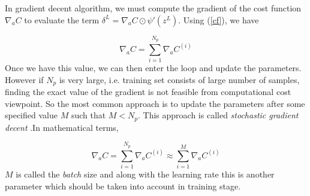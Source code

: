 \documentclass[12pt]{article}
\begin{document}
In gradient decent algorithm, we must compute the gradient of the cost function $\nabla_{a} C $ to evaluate the term $\delta^{L} = \nabla_{a} C \odot  \psi'(z^{L})$. Using (\ref{cf}), we have 

\begin{equation}
\nabla_{a} C =  \sum_{i=1}^{N_{p}}\nabla_{a}C^{(i)}
\end{equation}
Once we have this value, we can then enter the loop and update the parameters. However if $N_{p}$ is very large, i.e. training set consists of large number of samples, finding the exact value of the gradient is not feasible from computational cost viewpoint. So the most common approach is to update the parameters after some specified value $M$ such that $M < N_{p} $. This approach is called \textit{stochastic gradient decent }.In mathematical terms,   
   
\begin{equation}
\label{eq:bgd}
\nabla_{a} C =  \sum_{i=1}^{N_{p}}\nabla_{a}C^{(i)} \approx \sum_{i=1}^{M}\nabla_{a}C^{(i)}
\end{equation}
$M$ is called the \textit{batch} size and along with the learning rate this is another parameter which should be taken into account in training stage. 
\end{document}
